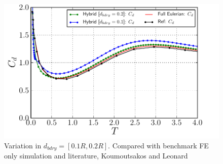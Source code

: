 %     

	
	\begin{figure}[!p]
	\centering
	\includegraphics[width=0.7\linewidth]{./figures/validation/isc/hybrid_ISC_drag_comparison_dbdry2.pdf}
	\caption{Variation in $d_{bdry} = [0.1R, 0.2R]$. Compared with benchmark FE only simulation and literature, Koumoutsakos and Leonard \cite{Koumoutsakos1995a}}
	\label{fig:hybrid_ISC_parameterSensitivity_dbdry}
	\end{figure}	
	
